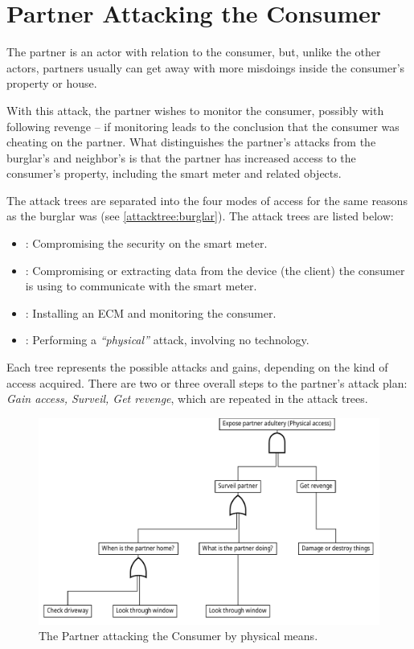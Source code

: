 
\section{Partner Attacking the Consumer}
The partner is an actor with relation to the consumer, but, unlike the other actors, partners usually can get away with more misdoings inside the consumer's property or house.

With this attack, the partner wishes to monitor the consumer, possibly with following revenge -- if monitoring leads to the conclusion that the consumer was cheating on the partner.
What distinguishes the partner's attacks from the burglar's and neighbor's is that the partner has increased access to the consumer's property, including the smart meter and related objects.

The attack trees are separated into the four modes of access for the same reasons as the burglar was (see \cref{attacktree:burglar}).
The attack trees are listed below:
\begin{itemize}
  \item {}: Compromising the security on the smart meter.
  \item {}: Compromising or extracting data from the device (the client) the consumer is using to communicate with the smart meter.
  \item {}: Installing an ECM and monitoring the consumer.
  \item {}: Performing a \emph{``physical''} attack, involving no technology.
\end{itemize}

Each tree represents the possible attacks and gains, depending on the kind of access acquired.
There are two or three overall steps to the partner's attack plan: \textit{Gain access, Surveil, Get revenge}, which are repeated in the attack trees.

\begin{figure}[h]
  \centering
  \includegraphics[width=\textwidth]{figures/graphviz/partner_vs_consumer_physical.pdf}
  \caption{The Partner attacking the Consumer by physical means.}
  \label{fig:attack_trees:partner:cheater_physical}
\end{figure}

